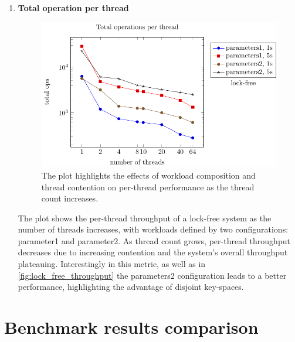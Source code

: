 \documentclass{article}
\begin{document}
\begin{enumerate}
    \item \textbf{Total operation per thread}
    \begin{figure}[H]
        \centering
        \includegraphics{../plots/lock_free_per_thread.pdf}
        \caption{The plot highlights the effects of workload composition and thread contention on per-thread performance as the thread count increases.}
        \label{fig:lock_free_ops_per_thread}
    \end{figure}
    The plot shows the per-thread throughput of a lock-free system as the number of threads increases, with workloads defined by two configurations: parameter1 and parameter2. As thread count grows, per-thread throughput decreases due to increasing contention and the system's overall throughput plateauing. 
    Interestingly in this metric, as well as in \ref{fig:lock_free_throughput} the parameters2 configuration leads to a better performance, highlighting the advantage of disjoint key-spaces.

    
\end{enumerate}

\newpage
\section{Benchmark results comparison}
\end{document}

